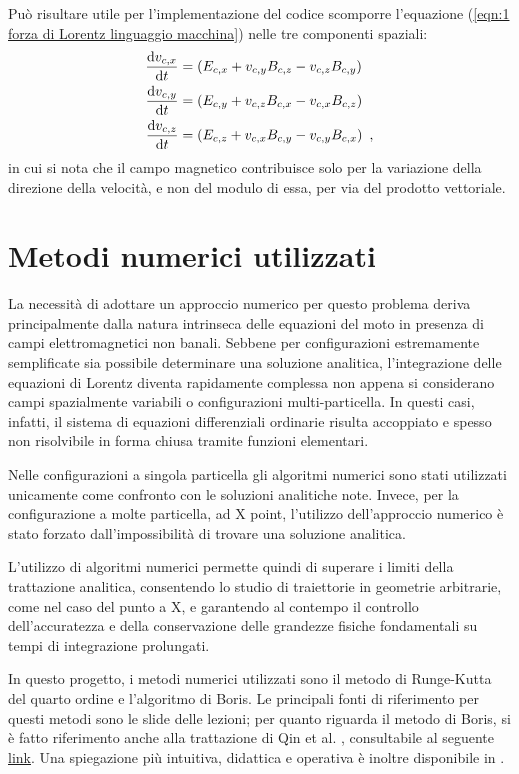 \documentclass[10pt,a4paper]{article}
\begin{document}
Può risultare utile per l'implementazione del codice scomporre l'equazione (\ref{eqn:1 forza di Lorentz linguaggio macchina}) nelle tre componenti spaziali:
\begin{align}
    \dv{v_{c,x}}{t} &= \left( E_{c,x} + v_{c,y}B_{c,z} - v_{c,z}B_{c,y} \right) \notag \\
    \dv{v_{c,y}}{t} &= \left( E_{c,y} + v_{c,z}B_{c,x} - v_{c,x}B_{c,z} \right) \label{eqn:1 equazione moto in componenti} \\
    \dv{v_{c,z}}{t} &= \left( E_{c,z} + v_{c,x}B_{c,y} - v_{c,y}B_{c,x} \right) \ , \notag
\end{align}
in cui si nota che il campo magnetico contribuisce solo per la variazione della direzione della velocità, e non del modulo di essa, per via del prodotto vettoriale.


\section{Metodi numerici utilizzati\label{sctn:metodi numerici}}

La necessità di adottare un approccio numerico per questo problema deriva principalmente dalla natura intrinseca delle equazioni del moto in presenza di campi elettromagnetici non banali. Sebbene per configurazioni estremamente semplificate sia possibile determinare una soluzione analitica, l'integrazione delle equazioni di Lorentz diventa rapidamente complessa non appena si considerano campi spazialmente variabili o configurazioni multi-particella. In questi casi, infatti, il sistema di equazioni differenziali ordinarie risulta accoppiato e spesso non risolvibile in forma chiusa tramite funzioni elementari. 

Nelle configurazioni a singola particella gli algoritmi numerici sono stati utilizzati unicamente come confronto con le soluzioni analitiche note. Invece, per la configurazione a molte particella, ad X point, l'utilizzo dell'approccio numerico è stato forzato dall'impossibilità di trovare una soluzione analitica.

L'utilizzo di algoritmi numerici permette quindi di superare i limiti della trattazione analitica, consentendo lo studio di traiettorie in geometrie arbitrarie, come nel caso del punto a X, e garantendo al contempo il controllo dell'accuratezza e della conservazione delle grandezze fisiche fondamentali su tempi di integrazione prolungati.

In questo progetto, i metodi numerici utilizzati sono il metodo di Runge-Kutta del quarto ordine e l'algoritmo di Boris. Le principali fonti di riferimento per questi metodi sono le slide delle lezioni; per quanto riguarda il metodo di Boris, si è fatto riferimento anche alla trattazione di Qin et al. \cite{Qin2013Boris}, consultabile al seguente \href{https://digital.library.unt.edu/ark:/67531/metadc843445/m2/1/high_res_d/1090047.pdf}{link}. Una spiegazione più intuitiva, didattica e operativa è inoltre disponibile in \cite{PICvxB2011}.
\end{document}
